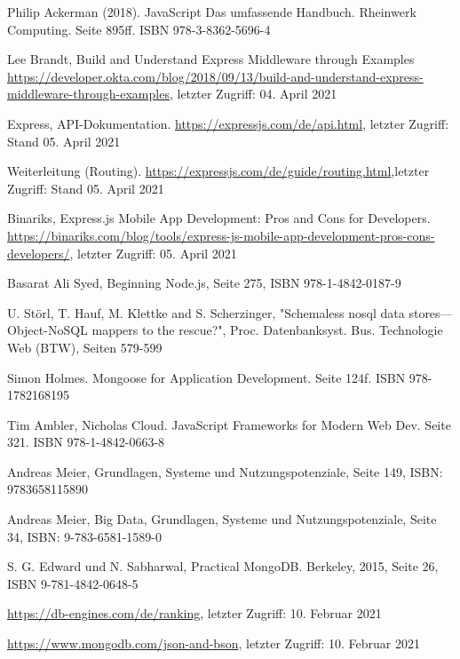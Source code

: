 \documentclass[11pt,a4paper]{article}
\begin{document}
\begin{itemize}
 Philip Ackerman (2018). JavaScript Das umfassende Handbuch. Rheinwerk Computing. Seite 895ff. ISBN 978-3-8362-5696-4

 Lee Brandt, Build and Understand Express Middleware through Examples \url{https://developer.okta.com/blog/2018/09/13/build-and-understand-express-middleware-through-examples}, letzter Zugriff: 04. April 2021

 Express, API-Dokumentation. \url{https://expressjs.com/de/api.html}, letzter Zugriff: Stand 05. April 2021

 Weiterleitung (Routing). \url{https://expressjs.com/de/guide/routing.html},letzter Zugriff: Stand 05. April 2021

 Binariks, Express.js Mobile App Development: Pros and Cons for Developers. \url{https://binariks.com/blog/tools/express-js-mobile-app-development-pros-cons-developers/}, letzter Zugriff: 05. April 2021

 Basarat Ali Syed, Beginning Node.js, Seite 275, ISBN 978-1-4842-0187-9

 U. Störl, T. Hauf, M. Klettke and S. Scherzinger, "Schemaless nosql data stores—Object-NoSQL mappers to the rescue?", Proc. Datenbanksyst. Bus. Technologie Web (BTW), Seiten 579-599


 Simon Holmes. Mongoose for Application Development. Seite 124f. ISBN 978-1782168195

 Tim Ambler, Nicholas Cloud. JavaScript Frameworks for Modern Web Dev. Seite 321. ISBN 978-1-4842-0663-8


%
%
%
%

 Andreas Meier, Grundlagen, Systeme und Nutzungspotenziale, Seite 149, ISBN: 9783658115890

 Andreas Meier, Big Data, Grundlagen, Systeme und Nutzungspotenziale, Seite 34, ISBN: 9-783-6581-1589-0

 S. G. Edward und N. Sabharwal, Practical MongoDB. Berkeley, 2015, Seite 26, ISBN 9-781-4842-0648-5

 \url{https://db-engines.com/de/ranking}, letzter Zugriff: 10. Februar 2021

 \url{https://www.mongodb.com/json-and-bson}, letzter Zugriff: 10. Februar 2021


\end{itemize}
\end{document}
